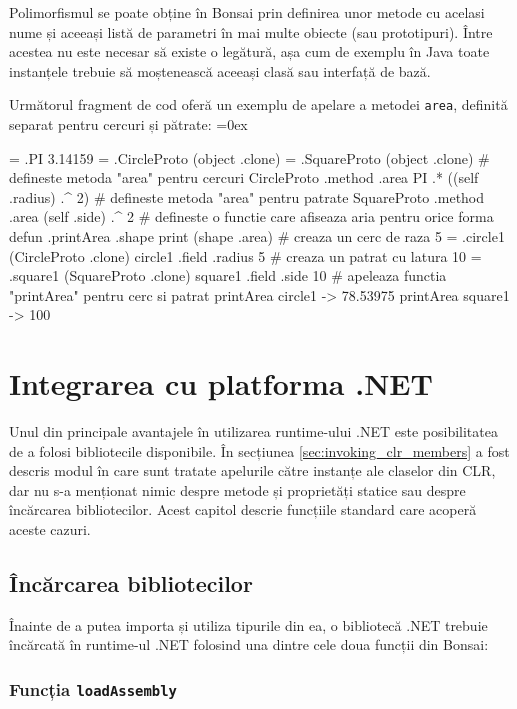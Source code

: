 \documentclass[12pt,a4paper]{memoir}
\renewcommand{\c}{\texttt}
\newenvironment{code}
{
\definecolor{shadecolor}{gray}{0.91}
\topsep=0ex
\relax
\shaded
\verbatim
}
{
\endverbatim
\endshaded
}
\begin{document}
Polimorfismul se poate obține în Bonsai prin definirea unor metode cu acelasi nume și aceeași listă de parametri în mai multe obiecte (sau prototipuri). Între acestea nu este necesar să existe o legătură, așa cum de exemplu în Java toate instanțele trebuie să moștenească aceeași clasă sau interfață de bază.

Următorul fragment de cod oferă un exemplu de apelare a metodei \c{area}, definită separat pentru cercuri și pătrate:
\begin{code}
= .PI 3.14159
= .CircleProto (object .clone)
= .SquareProto (object .clone)
# defineste metoda "area" pentru cercuri
CircleProto .method .area {
  PI .* ((self .radius) .^ 2)
}
# defineste metoda "area" pentru patrate
SquareProto .method .area { 
  (self .side) .^ 2 
}
# defineste o functie care afiseaza aria pentru orice forma
defun .printArea .shape { 
  print (shape .area)
}
# creaza un cerc de raza 5
= .circle1 (CircleProto .clone)
circle1 .field .radius 5
# creaza un patrat cu latura 10
= .square1 (SquareProto .clone)
square1 .field .side 10
# apeleaza functia "printArea" pentru cerc si patrat
printArea circle1
  -> 78.53975
printArea square1
  -> 100
\end{code}

\chapter{Integrarea cu platforma .NET}\label{ch:IntegratingWithDotNet}

Unul din principale avantajele în utilizarea runtime-ului .NET este posibilitatea de a folosi bibliotecile disponibile. În secțiunea \ref{sec:invoking_clr_members} a fost descris modul în care sunt tratate apelurile către instanțe ale claselor din CLR, dar nu s-a menționat nimic despre metode și proprietăți statice sau despre încărcarea bibliotecilor. Acest capitol descrie funcțiile standard care acoperă aceste cazuri.

\section{Încărcarea bibliotecilor}

Înainte de a putea importa și utiliza tipurile din ea, o bibliotecă .NET trebuie încărcată în runtime-ul .NET folosind una dintre cele doua funcții din Bonsai:

\subsection{Funcția \c{loadAssembly}}
\end{document}
